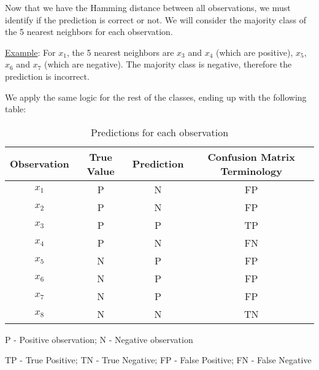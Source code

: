 \documentclass[12pt]{article}
\begin{document}
\begin{enumerate}[leftmargin=\labelsep]
    Now that we have the Hamming distance between all observations, we must identify if the prediction is correct or not. We will consider the majority class of the 5 nearest neighbors for each observation.
    
    \vspace{10pt}
    \underline{Example}: For $x_1$, the 5 nearest neighbors are $x_3$ and $x_4$ (which are positive), $x_5$, $x_6$ and $x_7$ (which are negative). The majority class is negative, therefore the prediction is incorrect.
    
    \newpage
    We apply the same logic for the rest of the classes, ending up with the following table:

    \begin{table}[H]
        \begin{center}
            \begin{threeparttable}
            \begin{tabular}{c|c|c|c}
                Observation & True Value & Prediction & Confusion Matrix Terminology\\
                \hline
                $x_1$ & P & N & FP\\
                $x_2$ & P & N & FP\\
                $x_3$ & P & P & TP\\
                $x_4$ & P & N & FN\\
                $x_5$ & N & P & FP\\
                $x_6$ & N & P & FP\\
                $x_7$ & N & P & FP\\
                $x_8$ & N & N & TN\\
            \end{tabular}
            \begin{tablenotes}
                \small
                \item[]
                \item[P - Positive observation; N - Negative observation]  
                \item[TP - True Positive; TN - True Negative; FP - False Positive; FN - False Negative] 
                \item[] 
            \end{tablenotes}
        \end{threeparttable}
            \caption{Predictions for each observation}
        \end{center}
    \end{table}


\end{enumerate}
\end{document}
